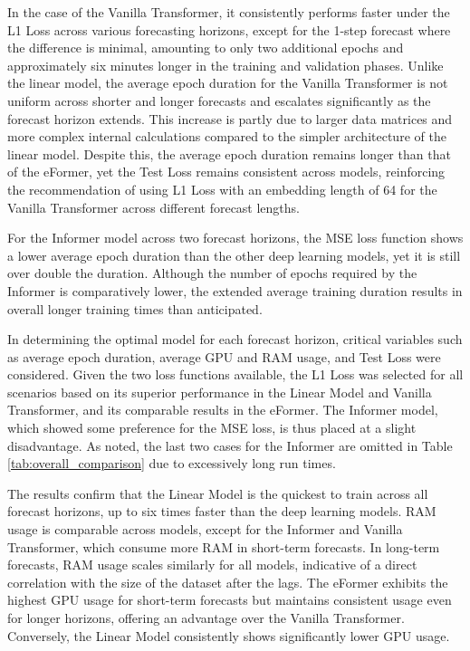 \documentclass{article}
\begin{document}
In the case of the Vanilla Transformer, it consistently performs faster under the L1 Loss across various forecasting horizons, except for the 1-step forecast where the difference is minimal, amounting to only two additional epochs and approximately six minutes longer in the training and validation phases. Unlike the linear model, the average epoch duration for the Vanilla Transformer is not uniform across shorter and longer forecasts and escalates significantly as the forecast horizon extends. This increase is partly due to larger data matrices and more complex internal calculations compared to the simpler architecture of the linear model. Despite this, the average epoch duration remains longer than that of the eFormer, yet the Test Loss remains consistent across models, reinforcing the recommendation of using L1 Loss with an embedding length of 64 for the Vanilla Transformer across different forecast lengths.

For the Informer model across two forecast horizons, the MSE loss function shows a lower average epoch duration than the other deep learning models, yet it is still over double the duration. Although the number of epochs required by the Informer is comparatively lower, the extended average training duration results in overall longer training times than anticipated.

In determining the optimal model for each forecast horizon, critical variables such as average epoch duration, average GPU and RAM usage, and Test Loss were considered. Given the two loss functions available, the L1 Loss was selected for all scenarios based on its superior performance in the Linear Model and Vanilla Transformer, and its comparable results in the eFormer. The Informer model, which showed some preference for the MSE loss, is thus placed at a slight disadvantage. As noted, the last two cases for the Informer are omitted in Table \ref{tab:overall_comparison} due to excessively long run times.

The results confirm that the Linear Model is the quickest to train across all forecast horizons, up to six times faster than the deep learning models. RAM usage is comparable across models, except for the Informer and Vanilla Transformer, which consume more RAM in short-term forecasts. In long-term forecasts, RAM usage scales similarly for all models, indicative of a direct correlation with the size of the dataset after the lags. The eFormer exhibits the highest GPU usage for short-term forecasts but maintains consistent usage even for longer horizons, offering an advantage over the Vanilla Transformer. Conversely, the Linear Model consistently shows significantly lower GPU usage.
\end{document}
